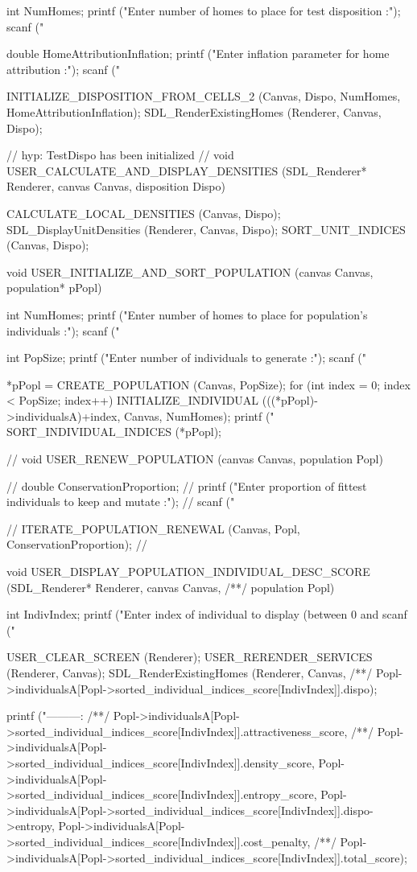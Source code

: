 \begin{C}
{	int NumHomes;
	printf ("Enter number of homes to place for test disposition :\n");
	scanf ("%
	
	double HomeAttributionInflation;
	printf ("Enter inflation parameter for home attribution :\n");
	scanf ("%
	
	INITIALIZE_DISPOSITION_FROM_CELLS_2 (Canvas, Dispo, NumHomes, HomeAttributionInflation);
	SDL_RenderExistingHomes (Renderer, Canvas, Dispo);
}


// hyp: TestDispo has been initialized
//
void USER_CALCULATE_AND_DISPLAY_DENSITIES (SDL_Renderer* Renderer, canvas Canvas, disposition Dispo){
	
	CALCULATE_LOCAL_DENSITIES (Canvas, Dispo);
	SDL_DisplayUnitDensities (Renderer, Canvas, Dispo);
	SORT_UNIT_INDICES (Canvas, Dispo);
}


void USER_INITIALIZE_AND_SORT_POPULATION (canvas Canvas, population* pPopl){
	
	int NumHomes;
	printf ("Enter number of homes to place for population's individuals :\n");
	scanf ("%
	
	int PopSize;
	printf ("Enter number of individuals to generate :\n");
	scanf ("%
	
	*pPopl = CREATE_POPULATION (Canvas, PopSize);
	for (int index = 0; index < PopSize; index++){
		INITIALIZE_INDIVIDUAL (((*pPopl)->individualsA)+index, Canvas, NumHomes);
		printf ("%
	}
	SORT_INDIVIDUAL_INDICES (*pPopl);
}


// void USER_RENEW_POPULATION (canvas Canvas, population Popl){
	// 	double ConservationProportion;
	// 	printf ("Enter proportion of fittest individuals to keep and mutate :\n");
	// 	scanf ("%
	
	// 	ITERATE_POPULATION_RENEWAL (Canvas, Popl, ConservationProportion);
	// }


void USER_DISPLAY_POPULATION_INDIVIDUAL_DESC_SCORE (SDL_Renderer* Renderer, canvas Canvas,
/**/ population Popl){
	
	int IndivIndex;
	printf ("Enter index of individual to display (between 0 and %
	scanf ("%
	
	USER_CLEAR_SCREEN (Renderer);
	USER_RERENDER_SERVICES (Renderer, Canvas);
	SDL_RenderExistingHomes (Renderer, Canvas,
	/**/ Popl->individualsA[Popl->sorted_individual_indices_score[IndivIndex]].dispo);
	
	printf ("\n---------\nAttractiveness : %
	/**/ Popl->individualsA[Popl->sorted_individual_indices_score[IndivIndex]].attractiveness_score,
	/**/ Popl->individualsA[Popl->sorted_individual_indices_score[IndivIndex]].density_score,
	Popl->individualsA[Popl->sorted_individual_indices_score[IndivIndex]].entropy_score,
	Popl->individualsA[Popl->sorted_individual_indices_score[IndivIndex]].dispo->entropy,
	Popl->individualsA[Popl->sorted_individual_indices_score[IndivIndex]].cost_penalty,
	/**/ Popl->individualsA[Popl->sorted_individual_indices_score[IndivIndex]].total_score);
}



\end{C}
